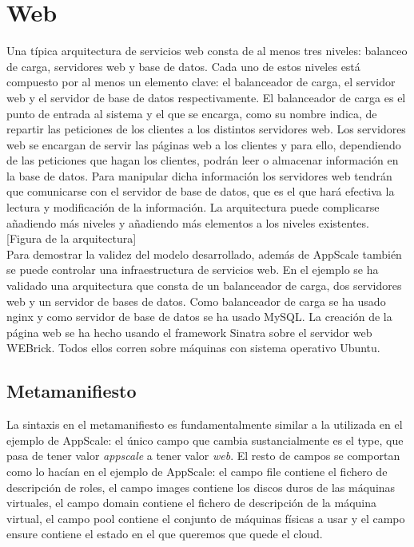 \chapter{Web}
\label{cap:web}

{\sf

Una típica arquitectura de servicios web consta de al menos tres niveles: balanceo de carga, servidores web y base de datos. Cada uno de estos niveles está compuesto por al menos un elemento clave: el balanceador de carga, el servidor web y el servidor de base de datos respectivamente. El balanceador de carga es el punto de entrada al sistema y el que se encarga, como su nombre indica, de repartir las peticiones de los clientes a los distintos servidores web. Los servidores web se encargan de servir las páginas web a los clientes y para ello, dependiendo de las peticiones que hagan los clientes, podrán leer o almacenar información en la base de datos. Para manipular dicha información los servidores web tendrán que comunicarse con el servidor de base de datos, que es el que hará efectiva la lectura y modificación de la información. La arquitectura puede complicarse añadiendo más niveles y añadiendo más elementos a los niveles existentes.\\

[Figura de la arquitectura]\\

Para demostrar la validez del modelo desarrollado, además de AppScale también se puede controlar una infraestructura de servicios web. En el ejemplo se ha validado una arquitectura que consta de un balanceador de carga, dos servidores web y un servidor de bases de datos. Como balanceador de carga se ha usado nginx y como servidor de base de datos se ha usado MySQL. La creación de la página web se ha hecho usando el framework Sinatra sobre el servidor web WEBrick. Todos ellos corren sobre máquinas con sistema operativo Ubuntu.\\

\section{Metamanifiesto}

La sintaxis en el metamanifiesto es fundamentalmente similar a la utilizada en el ejemplo de AppScale: el único campo que cambia sustancialmente es el type, que pasa de tener valor \emph{appscale} a tener valor \emph{web}. El resto de campos se comportan como lo hacían en el ejemplo de AppScale: el campo file contiene el fichero de descripción de roles, el campo images contiene los discos duros de las máquinas virtuales, el campo domain contiene el fichero de descripción de la máquina virtual, el campo pool contiene el conjunto de máquinas físicas a usar y el campo ensure contiene el estado en el que queremos que quede el cloud.

}

